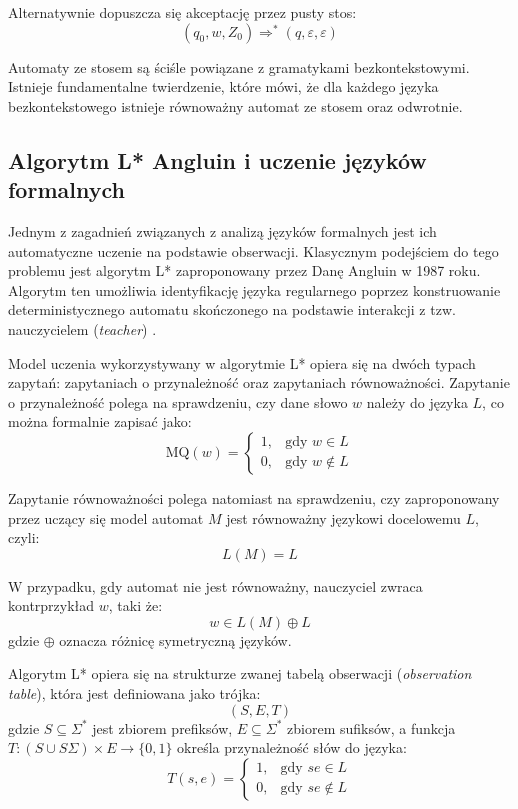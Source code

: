 \documentclass[12pt]{article}
\begin{document}
Alternatywnie dopuszcza się akceptację przez pusty stos:
\begin{equation}
(q_0, w, Z_0) \Rightarrow^* (q, \varepsilon, \varepsilon)
\end{equation}

Automaty ze stosem są ściśle powiązane z gramatykami bezkontekstowymi. Istnieje fundamentalne twierdzenie, które mówi, że dla każdego języka bezkontekstowego istnieje równoważny automat ze stosem oraz odwrotnie.

\subsection{Algorytm L* Angluin i uczenie języków formalnych}

Jednym z zagadnień związanych z analizą języków formalnych jest ich automatyczne uczenie na podstawie obserwacji. Klasycznym podejściem do tego problemu jest algorytm L* zaproponowany przez Danę Angluin w 1987 roku. Algorytm ten umożliwia identyfikację języka regularnego poprzez konstruowanie deterministycznego automatu skończonego na podstawie interakcji z tzw. nauczycielem (\textit{teacher}) \cite{angluin1987}.

Model uczenia wykorzystywany w algorytmie L* opiera się na dwóch typach zapytań: zapytaniach o przynależność oraz zapytaniach równoważności. Zapytanie o przynależność polega na sprawdzeniu, czy dane słowo $w$ należy do języka $L$, co można formalnie zapisać jako:
\begin{equation}
\text{MQ}(w) = 
\begin{cases}
1, & \text{gdy } w \in L \\
0, & \text{gdy } w \notin L
\end{cases}
\end{equation}

Zapytanie równoważności polega natomiast na sprawdzeniu, czy zaproponowany przez uczący się model automat $M$ jest równoważny językowi docelowemu $L$, czyli:
\begin{equation}
L(M) = L
\end{equation}

W przypadku, gdy automat nie jest równoważny, nauczyciel zwraca kontrprzykład $w$, taki że:
\begin{equation}
w \in L(M) \oplus L
\end{equation}
gdzie $\oplus$ oznacza różnicę symetryczną języków.

Algorytm L* opiera się na strukturze zwanej tabelą obserwacji (\textit{observation table}), która jest definiowana jako trójka:
\begin{equation}
(S, E, T)
\end{equation}
gdzie $S \subseteq \Sigma^*$ jest zbiorem prefiksów, $E \subseteq \Sigma^*$ zbiorem sufiksów, a funkcja $T: (S \cup S\Sigma) \times E \rightarrow \{0,1\}$ określa przynależność słów do języka:
\begin{equation}
T(s, e) = 
\begin{cases}
1, & \text{gdy } se \in L \\
0, & \text{gdy } se \notin L
\end{cases}
\end{equation}
\end{document}
